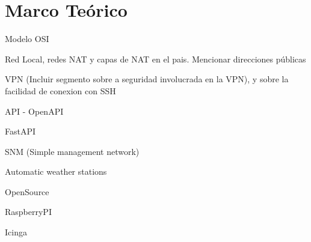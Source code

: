 \section{Marco Teórico}

Modelo OSI

Red Local, redes NAT y capas de NAT en el pais. Mencionar direcciones públicas

VPN (Incluir segmento sobre a seguridad involucrada en la VPN), y sobre la facilidad de conexion con SSH

API - OpenAPI

FastAPI

SNM (Simple management network)

Automatic weather stations

OpenSource

RaspberryPI

Icinga
